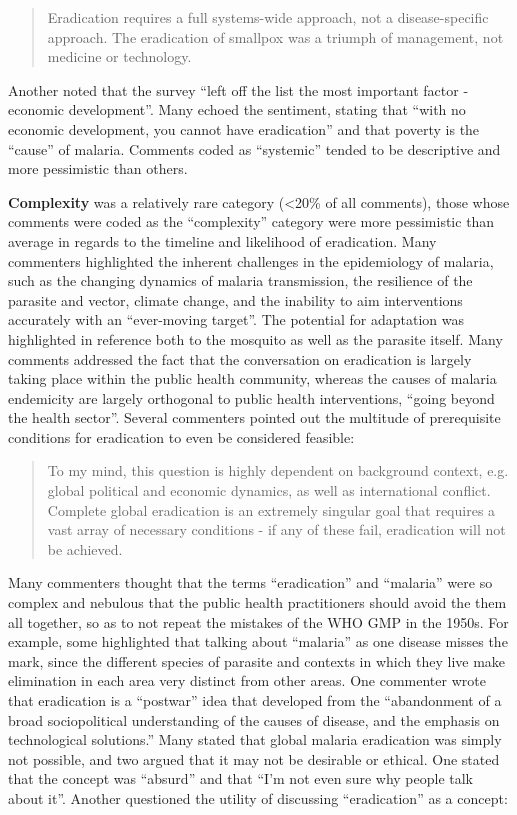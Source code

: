\documentclass[]{article}
\begin{document}
\begin{quote}
Eradication requires a full systems-wide approach, not a disease-specific approach. The eradication of smallpox was a triumph of management, not medicine or technology.
\end{quote}

Another noted that the survey ``left off the list the most important
factor - economic development''. Many echoed the sentiment, stating that
``with no economic development, you cannot have eradication'' and that
poverty is the ``cause'' of malaria. Comments coded as ``systemic''
tended to be descriptive and more pessimistic than others.

\textbf{Complexity} was a relatively rare category (\textless{}20\% of
all comments), those whose comments were coded as the ``complexity''
category were more pessimistic than average in regards to the timeline
and likelihood of eradication. Many commenters highlighted the inherent
challenges in the epidemiology of malaria, such as the changing dynamics
of malaria transmission, the resilience of the parasite and vector,
climate change, and the inability to aim interventions accurately with
an ``ever-moving target''. The potential for adaptation was highlighted
in reference both to the mosquito as well as the parasite itself. Many
comments addressed the fact that the conversation on eradication is
largely taking place within the public health community, whereas the
causes of malaria endemicity are largely orthogonal to public health
interventions, ``going beyond the health sector''. Several commenters
pointed out the multitude of prerequisite conditions for eradication to
even be considered feasible:

\begin{quote}
To my mind, this question is highly dependent on background context, e.g. global political and economic dynamics, as well as international conflict. Complete global eradication is an extremely singular goal that requires a vast array of necessary conditions - if any of these fail, eradication will not be achieved.  
\end{quote}

Many commenters thought that the terms ``eradication'' and ``malaria''
were so complex and nebulous that the public health practitioners should
avoid the them all together, so as to not repeat the mistakes of the WHO
GMP in the 1950s. For example, some highlighted that talking about
``malaria'' as one disease misses the mark, since the different species
of parasite and contexts in which they live make elimination in each
area very distinct from other areas. One commenter wrote that
eradication is a ``postwar'' idea that developed from the ``abandonment
of a broad sociopolitical understanding of the causes of disease, and
the emphasis on technological solutions.'' Many stated that global
malaria eradication was simply not possible, and two argued that it may
not be desirable or ethical. One stated that the concept was ``absurd''
and that ``I'm not even sure why people talk about it''. Another
questioned the utility of discussing ``eradication'' as a concept:
\end{document}
